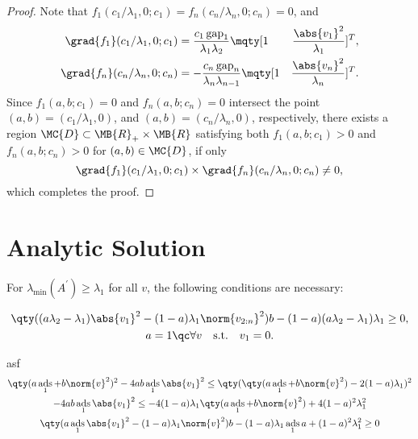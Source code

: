 \documentclass[nobib]{my-handout}
\theoremstyle{definition}
\theoremstyle{remark}
\DeclareMathOperator{\ads}{ads}
\DeclareMathOperator{\gap}{gap}
\begin{document}
\begin{proof}
	Note that $f_1(c_1/\lambda_1, 0; c_1) = f_n(c_n/\lambda_n, 0; c_n) = 0$, and
	\begin{align*}
		\grad{f_1}(c_1/\lambda_1, 0; c_1) &= \frac{c_1 \gap_1}{\lambda_1 \lambda_2}
		\mqty[1 & \frac{\abs{v_1}^2}{\lambda_1}]^T, \\
		\grad{f_n}(c_n/\lambda_n, 0; c_n) &= - \frac{c_n \gap_n}{\lambda_n
		\lambda_{n-1}} \mqty[1 &
		\frac{\abs{v_n}^2}{\lambda_n}]^T.
	\end{align*}
	Since $f_1(a, b; c_1) = 0$ and $f_n(a, b; c_n) = 0$ intersect the point
	$(a,b) = (c_1/\lambda_1, 0)$, and $(a, b) = (c_n/\lambda_n, 0)$,
	respectively, there exists a region $\MC{D} \subset \MB{R}_{+} \times
	\MB{R}$ satisfying both $f_1(a, b; c_1) > 0$ and $f_n(a, b; c_n) > 0$ for
	$(a,b) \in \MC{D}$, if only 
	\begin{equation*}
		\grad{f_1}(c_1/\lambda_1, 0; c_1) \times \grad{f_n}(c_n/\lambda_n, 0; c_n)
		\ne 0,
	\end{equation*}
	which completes the proof.
\end{proof}


\section{Analytic Solution}





 

For $\lambda_{\min}(A^\prime) \ge \lambda_1$ for all $v$, the following
conditions are necessary:
\begin{fullwidth}
	\begin{gather}
		\qty((a \lambda_2 - \lambda_1) \abs{v_1}^2 - (1-a) \lambda_1
		\norm{v_{2:n}}^2) b - (1-a) (a \lambda_2 - \lambda_1) \lambda_1 \ge 0, \\
		a = 1 \qc \forall v \quad \text{s.t.} \quad v_1 = 0.
	\end{gather}
\end{fullwidth}
asf
\begin{gather*}
	\qty(a \ads_1 + b \norm{v}^2)^2 - 4 ab \ads_1 \abs{v_1}^2
	\le \qty(\qty(a \ads_1 + b \norm{v}^2) - 2 (1-a) \lambda_1)^2 \\
	- 4 ab \ads_1 \abs{v_1}^2
	\le - 4 (1-a) \lambda_1 \qty(a \ads_1 + b \norm{v}^2) + 4 (1-a)^2
	\lambda_1^2 \\
	\qty(a \ads_1 \abs{v_1}^2 - (1-a) \lambda_1 \norm{v}^2) b
	- (1-a) \lambda_1 \ads_1 a + (1-a)^2 \lambda_1^2 \ge 0
\end{gather*}




\end{document}
